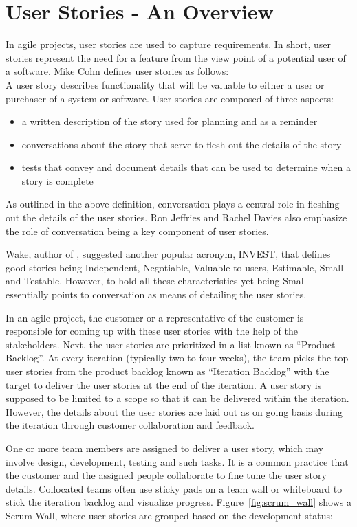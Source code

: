 \section{User Stories - An Overview}
In agile projects, user stories are used to capture requirements. In short, user stories represent the need for a feature from the view point of a potential user of a software. Mike Cohn \cite{user_stories_applied} defines user stories as follows:\\
A user story describes functionality that will be valuable to either a user or purchaser of a system or software. User stories are composed of three aspects:
\begin{itemize}
	\item a written description of the story used for planning and as a reminder
	\item conversations about the story that serve to flesh out the details of the story
	\item tests that convey and document details that can be used to determine when a story is complete
\end{itemize}

As outlined in the above definition, conversation plays a central role in fleshing out the details of the user stories. Ron Jeffries \cite{ron_jeffries} and Rachel Davies\cite{rachel_davies} also emphasize the role of conversation being a key component of user stories.

Wake, author of \cite{bill_wake}, suggested another popular acronym, INVEST, that defines good stories being Independent, Negotiable, Valuable to users, Estimable, Small and Testable. However, to hold all these characteristics yet being Small essentially points to conversation as means of detailing the user stories.

In an agile project, the customer or a representative of the customer is responsible for coming up with these user stories with the help of the stakeholders. Next, the user stories are prioritized in a list known as ``Product Backlog''. At every iteration (typically two to four weeks), the team picks the top user stories from the product backlog known as ``Iteration Backlog'' with the target to deliver the user stories at the end of the iteration. A user story is supposed to be limited to a scope so that it can be delivered within the iteration. However, the details about the user stories are laid out as on going basis during the iteration through customer collaboration and feedback.

One or more team members are assigned to deliver a user story, which may involve design, development, testing and such tasks. It is a common practice that the customer and the assigned people collaborate to fine tune the user story details. Collocated teams often use sticky pads on a team wall or whiteboard to stick the iteration backlog and visualize progress. Figure~\ref{fig:scrum_wall} shows a Scrum Wall, where user stories are grouped based on the development status:

